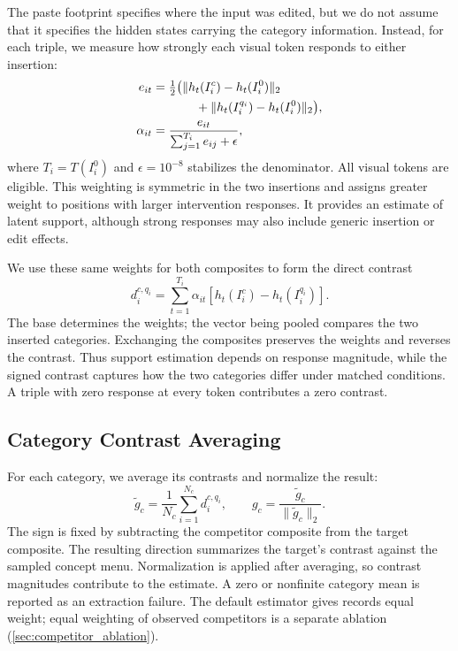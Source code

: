 The paste footprint specifies where the input was edited, but we do not
assume that it specifies the hidden states carrying the category
information. Instead, for each triple, we measure how strongly each
visual token responds to either insertion:
\begin{equation}
    \begin{aligned}
        e_{it}
        &=\tfrac12\bigl(
            \|h_t(I_i^c)-h_t(I_i^0)\|_2\\
        &\hspace{3.5em}
            +\|h_t(I_i^{q_i})-h_t(I_i^0)\|_2
        \bigr),\\
        \alpha_{it}
        &=\frac{e_{it}}{\sum_{j=1}^{T_i}e_{ij}+\epsilon},
    \end{aligned}
    \label{eq:response_weights}
\end{equation}
where \(T_i=T(I_i^0)\) and \(\epsilon=10^{-8}\) stabilizes the denominator.
All visual tokens are eligible. This weighting is symmetric in the two
insertions and assigns greater weight to positions with larger
intervention responses. It provides an estimate of latent support,
although strong responses may also include generic insertion or edit
effects.

We use these same weights for both composites to form the direct contrast
\begin{equation}
    d_i^{c,q_i}
    =
    \sum_{t=1}^{T_i}\alpha_{it}
    \left[h_t(I_i^c)-h_t(I_i^{q_i})\right].
    \label{eq:paired_contrast}
\end{equation}
The base determines the weights; the vector being pooled compares the
two inserted categories. Exchanging the composites preserves the weights
and reverses the contrast. Thus support estimation depends on response
magnitude, while the signed contrast captures how the two categories
differ under matched conditions. A triple with zero response at every
token contributes a zero contrast.

\subsection{Category Contrast Averaging}
\label{sec:direction_estimation}

For each category, we average its contrasts and normalize the result:
\begin{equation}
    \widetilde g_c=\frac{1}{N_c}\sum_{i=1}^{N_c}d_i^{c,q_i},
    \qquad
    g_c=\frac{\widetilde g_c}{\|\widetilde g_c\|_2}.
    \label{eq:direction_average}
\end{equation}
The sign is fixed by subtracting the competitor composite from the target
composite. The resulting direction summarizes the target's contrast
against the sampled concept menu. Normalization is applied after
averaging, so contrast magnitudes contribute to the estimate.
A zero or nonfinite category mean is reported as an extraction failure.
The default estimator gives records equal weight; equal weighting of
observed competitors is a separate ablation
(\cref{sec:competitor_ablation}).

